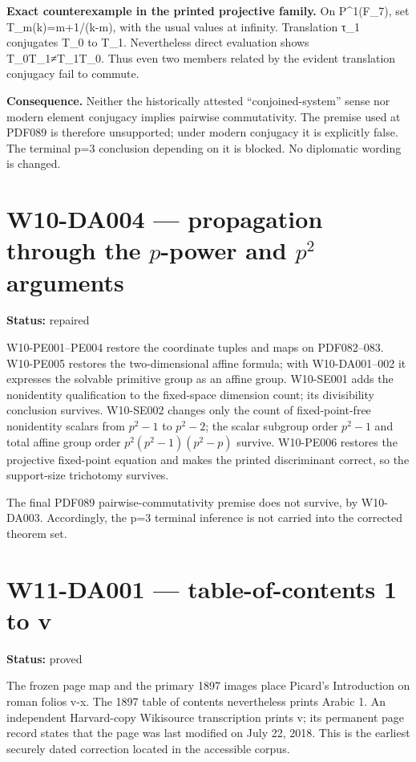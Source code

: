 \documentclass[
  10pt,
  a4paper,
]{scrreprt}
\begin{document}
\textbf{Exact counterexample in the printed projective family.} On
P\^{}1(F\_7), set T\_m(k)=m+1/(k-m), with the usual values at infinity.
Translation τ\_1 conjugates T\_0 to T\_1. Nevertheless direct evaluation
shows T\_0T\_1≠T\_1T\_0. Thus even two members related by the evident
translation conjugacy fail to commute.

\textbf{Consequence.} Neither the historically attested
``conjoined-system'' sense nor modern element conjugacy implies pairwise
commutativity. The premise used at PDF089 is therefore unsupported;
under modern conjugacy it is explicitly false. The terminal p=3
conclusion depending on it is blocked. No diplomatic wording is changed.

\section{\texorpdfstring{W10-DA004 --- propagation through the
\(p\)-power and \(p^2\)
arguments}{W10-DA004 --- propagation through the p-power and p\^{}2 arguments}}\label{w10-da004-propagation-through-the-p-power-and-p2-arguments}

\textbf{Status:} repaired

W10-PE001--PE004 restore the coordinate tuples and maps on PDF082--083.
W10-PE005 restores the two-dimensional affine formula; with
W10-DA001--002 it expresses the solvable primitive group as an affine
group. W10-SE001 adds the nonidentity qualification to the fixed-space
dimension count; its divisibility conclusion survives. W10-SE002 changes
only the count of fixed-point-free nonidentity scalars from \(p^2-1\) to
\(p^2-2\); the scalar subgroup order \(p^2-1\) and total affine group
order \(p^2(p^2-1)(p^2-p)\) survive. W10-PE006 restores the projective
fixed-point equation and makes the printed discriminant correct, so the
support-size trichotomy survives.

The final PDF089 pairwise-commutativity premise does not survive, by
W10-DA003. Accordingly, the p=3 terminal inference is not carried into
the corrected theorem set.

\section{W11-DA001 --- table-of-contents 1 to
v}\label{w11-da001-table-of-contents-1-to-v}

\textbf{Status:} proved

The frozen page map and the primary 1897 images place Picard's
Introduction on roman folios v-x. The 1897 table of contents
nevertheless prints Arabic 1. An independent Harvard-copy Wikisource
transcription prints v; its permanent page record states that the page
was last modified on July 22, 2018. This is the earliest securely dated
correction located in the accessible corpus.
\end{document}
